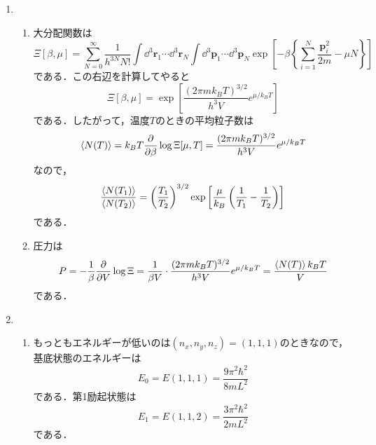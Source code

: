 \documentclass[a4paper,pdflatex,ja=standard]{bxjsarticle}
\begin{document}
\begin{enumerate}
  \item 
  \begin{enumerate}
    \item 
    大分配関数は
    \begin{equation}
      \Xi[\beta,\mu]
      =
      \sum_{N=0}^{\infty}
      \frac{1}{h^{3N}N!}
      \int\dd^3 \bm{r}_{1}\cdots\dd^3 \bm{r}_{N}
      \int\dd^3 \bm{p}_{1}\cdots\dd^3 \bm{p}_{N}
      \exp\left[ -\beta\left\{  
        \sum_{i=1}^{N}\frac{\bm{p}_{i}^{2}}{2m}
        -
        \mu N
      \right\} \right]
    \end{equation}
    である．この右辺を計算してやると
    \begin{equation}
      \Xi[\beta,\mu]
      =
      \exp\left[  
        \frac{(2\pi mk_{B}T)^{3/2}}{h^{3}V}e^{\mu/k_{B}T}
      \right]
    \end{equation}
    である．したがって，温度$T$のときの平均粒子数は
    \begin{equation}
      \ev{N(T)}
      =
      k_{B}T\pdv{}{\beta}
      \log\Xi[\mu,T]
      =
      \frac{(2\pi mk_{B}T)^{3/2}}{h^{3}V}e^{\mu/k_{B}T}
    \end{equation}
    なので，
    \begin{equation}
      \frac{\ev{N(T_{1})}}{\ev{N(T_{2})}}
      =
      \left( \frac{T_{1}}{T_{2}} \right)^{3/2}
      \exp\left[ 
        \frac{\mu}{k_{B}}\left( \frac{1}{T_{1}}-\frac{1}{T_{2}} \right) 
      \right]
    \end{equation}
    である．

    \item 
    圧力は
    \begin{equation}
      P
      =
      -
      \frac{1}{\beta}\pdv{}{V}
      \log\Xi
      =
      \frac{1}{\beta V}
      \cdot
      \frac{(2\pi mk_{B}T)^{3/2}}{h^{3}V}e^{\mu/k_{B}T}
      =
      \frac{\ev{N(T)}k_{B}T}{V}
    \end{equation}
    である．

  \end{enumerate}


  \item 

  \begin{enumerate}
    
    \item 

    もっともエネルギーが低いのは$(n_{x},n_{y},n_{z})=(1,1,1)$のときなので，基底状態のエネルギーは
    \begin{equation}
      E_0
      =
      E(1,1,1)
      =
      \frac{9\pi^2\hbar^2}{8mL^2}
    \end{equation}
    である．第1励起状態は
    \begin{equation}
      E_1
      =
      E(1,1,2)
      =
      \frac{3\pi^2\hbar^2}{2mL^2}
    \end{equation}
    である．
    

\end{enumerate}
\end{enumerate}
\end{document}
